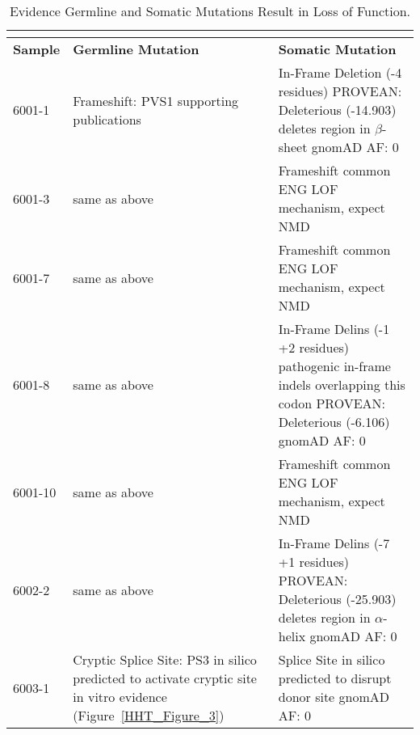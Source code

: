 \begin{table}[]
\footnotesize
\renewcommand{\arraystretch}{1.7} 
\centering
\caption[Predicted Consequences of Germline and Somatic Mutations]{Evidence Germline and Somatic Mutations Result in Loss of Function.}

\begin{tabularx}{\textwidth}{l p{3.6cm} X}
\multicolumn{3}{l}{} \\
\toprule
\textbf{Sample} & \textbf{Germline Mutation} & \textbf{Somatic Mutation} \\
\midrule
6001-1 & Frameshift: PVS1 \newline 6 supporting publications &In-Frame Deletion (-4 residues) \newline PROVEAN: Deleterious (-14.903) \newline deletes region in $\beta$-sheet \newline gnomAD AF: 0 \\\hline
6001-3 & same as above & Frameshift \newline common ENG LOF mechanism, expect NMD \\\hline
6001-7 & same as above & Frameshift \newline common ENG LOF mechanism, expect NMD \\\hline
6001-8 & same as above & In-Frame Delins (-1 +2 residues) \newline 2 pathogenic in-frame indels overlapping this codon \citep{shovlin1997, argyriou2006} \newline PROVEAN: Deleterious (-6.106) \newline gnomAD AF: 0 \\\hline
6001-10 & same as above & Frameshift \newline common ENG LOF mechanism, expect NMD \\\hline
6002-2 & same as above & In-Frame Delins (-7 +1 residues) \newline PROVEAN: Deleterious (-25.903) \newline deletes region in $\alpha$-helix \newline gnomAD AF: 0 \\\hline
6003-1 & Cryptic Splice Site: PS3 \newline in silico predicted to activate cryptic site \newline in vitro evidence (Figure~\ref{HHT_Figure_3}) & Splice Site \newline in silico predicted to disrupt donor site \newline gnomAD AF: 0 \\\hline

\end{tabularx}
\end{table}
